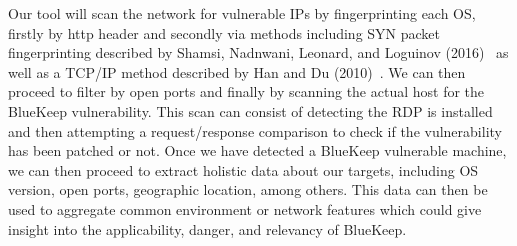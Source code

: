 Our tool will scan the network for vulnerable IPs by fingerprinting each OS, firstly by http header and secondly via methods including SYN packet fingerprinting described by Shamsi, Nadnwani, Leonard, and Loguinov (2016)~\cite{zain_ankur_derek_log_2014} as well as a TCP/IP method described by Han and Du (2010)~\cite{han_du_2010}. We can then proceed to filter by open ports and finally by scanning the actual host for the BlueKeep vulnerability. This scan can consist of detecting the RDP is installed and then  attempting a request/response comparison to check if the vulnerability has been patched or not. Once we have detected a BlueKeep vulnerable machine, we can then proceed to extract holistic data about our targets, including OS version, open ports, geographic location, among others. This data can then be used to aggregate common environment or network features which could give insight into the applicability, danger, and relevancy of BlueKeep.